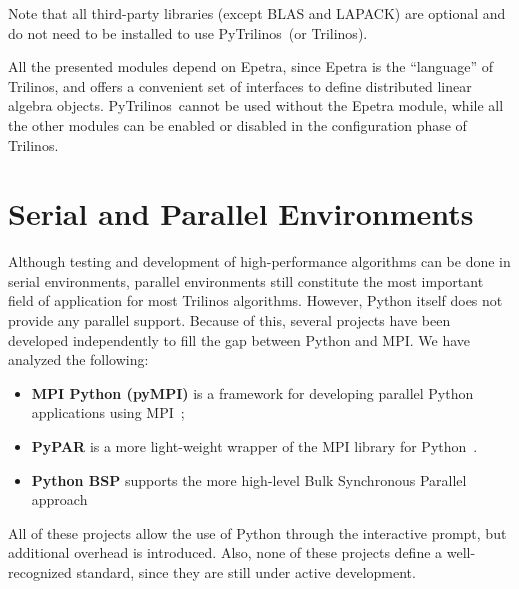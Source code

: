 \documentclass[acmtocl]{acmtrans2m}
\newcommand{\PyTrilinos}{{PyTrilinos}}
\begin{document}
Note that all third-party libraries (except BLAS and LAPACK) are
optional and do not need to be installed to use \PyTrilinos\ (or
Trilinos).

All the presented modules depend on Epetra, since Epetra is the
``language'' of Trilinos, and offers a convenient set of interfaces to
define distributed linear algebra objects.  \PyTrilinos\ cannot be
used without the Epetra module, while all the other modules can be
enabled or disabled in the configuration phase of Trilinos.

\section{Serial and Parallel Environments}
\label{sec:serial}

Although testing and development of high-performance algorithms can be
done in serial environments, parallel environments still constitute
the most important field of application for most Trilinos algorithms.
However, Python itself does not provide any parallel support.  Because
of this, several projects have been developed independently to fill
the gap between Python and MPI.  We have analyzed the following:

\begin{itemize}

\item {\bf MPI Python (pyMPI)} is a framework for developing parallel
  Python applications using MPI~\cite{MPI-Python};

\item {\bf PyPAR} is a more light-weight wrapper of the MPI library
  for Python~\cite{pypar}.

\item {\bf Python BSP} supports the more high-level Bulk Synchronous
  Parallel approach~\cite{bsp}

\end{itemize}

All of these projects allow the use of Python through the interactive
prompt, but additional overhead is introduced.  Also, none of these
projects define a well-recognized standard, since they are still under
active development.
\end{document}
